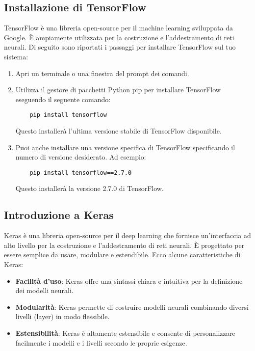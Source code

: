 \documentclass{article}
\begin{document}
\subsection{Installazione di TensorFlow}
TensorFlow è una libreria open-source per il machine learning sviluppata da Google. È ampiamente utilizzata per la costruzione e l'addestramento di reti neurali. Di seguito sono riportati i passaggi per installare TensorFlow sul tuo sistema:

\begin{enumerate}
    \item Apri un terminale o una finestra del prompt dei comandi.
    \item Utilizza il gestore di pacchetti Python pip per installare TensorFlow eseguendo il seguente comando:
    
    \begin{verbatim}
    pip install tensorflow
    \end{verbatim}
    
    Questo installerà l'ultima versione stabile di TensorFlow disponibile.
    
    \item Puoi anche installare una versione specifica di TensorFlow specificando il numero di versione desiderato. Ad esempio:
    
    \begin{verbatim}
    pip install tensorflow==2.7.0
    \end{verbatim}
    
    Questo installerà la versione 2.7.0 di TensorFlow.
\end{enumerate}

\subsection{Introduzione a Keras}
Keras è una libreria open-source per il deep learning che fornisce un'interfaccia ad alto livello per la costruzione e l'addestramento di reti neurali. È progettato per essere semplice da usare, modulare e estendibile. Ecco alcune caratteristiche di Keras:

\begin{itemize}
    \item \textbf{Facilità d'uso}: Keras offre una sintassi chiara e intuitiva per la definizione dei modelli neurali.
    \item \textbf{Modularità}: Keras permette di costruire modelli neurali combinando diversi livelli (layer) in modo flessibile.
    \item \textbf{Estensibilità}: Keras è altamente estensibile e consente di personalizzare facilmente i modelli e i livelli secondo le proprie esigenze.
\end{itemize}
\end{document}
